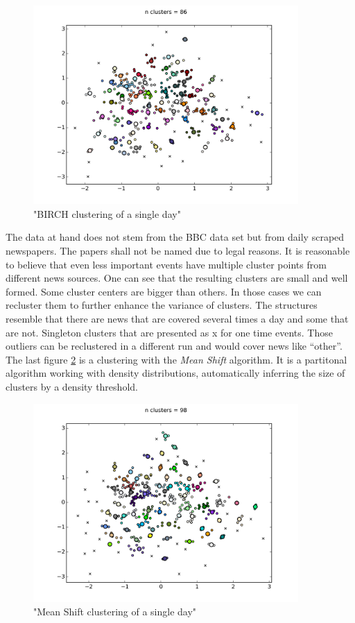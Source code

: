   \begin{figure}[h!]
    \centering
      \includegraphics[width=0.9\textwidth]{birch_clustering.png}
      \caption{"BIRCH clustering of a single day"}
      \label{birch_clustering}
  \end{figure}

The data at hand does not stem from the BBC data set but from daily scraped newspapers. The papers shall not be named due to legal reasons. It is reasonable to believe that even less important events have multiple cluster points from different news sources. One can see that the resulting clusters are small and well formed. Some cluster centers are bigger than others. In those cases we can recluster them to further enhance the variance of clusters. The structures resemble that there are news that are covered several times a day and some that are not. Singleton clusters that are presented as x for one time events. Those outliers can be reclustered in a different run and would cover news like ``other''. The last figure \ref{mean_shift_clustering} is a clustering with the \emph{Mean Shift} algorithm. It is a partitonal algorithm working with density distributions, automatically inferring the size of clusters by a density threshold.

  \begin{figure}[h!]
    \centering
      \includegraphics[width=0.9\textwidth]{mean_shift_clustering.png}
      \caption{"Mean Shift clustering of a single day"}
      \label{mean_shift_clustering}
  \end{figure} 

